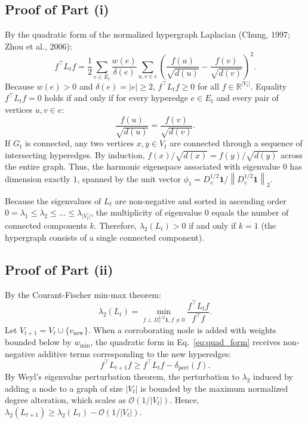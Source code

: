 \documentclass[11pt]{article}
\newcommand{\R}{\mathbb{R}}
\newcommand{\norm}[1]{\left\lVert#1\right\rVert}
\begin{document}
\subsection{Proof of Part (i)}
By the quadratic form of the normalized hypergraph Laplacian (Chung, 1997; Zhou et al., 2006):
\begin{equation}
  f^\top L_t f = \frac{1}{2} \sum_{e \in E_t} \frac{w(e)}{\delta(e)} \sum_{u, v \in e} \left( \frac{f(u)}{\sqrt{d(u)}} - \frac{f(v)}{\sqrt{d(v)}} \right)^2.
  \label{eq:quad_form}
\end{equation}
Because $w(e) > 0$ and $\delta(e) = |e| \ge 2$, $f^\top L_t f \ge 0$ for all $f \in \R^{|V_t|}$.
Equality $f^\top L_t f = 0$ holds if and only if for every hyperedge $e \in E_t$ and every pair of vertices $u, v \in e$:
\begin{equation}
  \frac{f(u)}{\sqrt{d(u)}} = \frac{f(v)}{\sqrt{d(v)}}.
\end{equation}
If $G_t$ is connected, any two vertices $x, y \in V_t$ are connected through a sequence of intersecting hyperedges. By induction, $f(x)/\sqrt{d(x)} = f(y)/\sqrt{d(y)}$ across the entire graph. Thus, the harmonic eigenspace associated with eigenvalue $0$ has dimension exactly $1$, spanned by the unit vector $\phi_1 = D_v^{1/2} \mathbf{1} / \norm{D_v^{1/2} \mathbf{1}}_2$.

Because the eigenvalues of $L_t$ are non-negative and sorted in ascending order $0 = \lambda_1 \le \lambda_2 \le \dots \le \lambda_{|V_t|}$, the multiplicity of eigenvalue $0$ equals the number of connected components $k$. Therefore, $\lambda_2(L_t) > 0$ if and only if $k = 1$ (the hypergraph consists of a single connected component).

\subsection{Proof of Part (ii)}
By the Courant-Fischer min-max theorem:
\begin{equation}
  \lambda_2(L_t) = \min_{f \perp D_v^{1/2}\mathbf{1}, f \ne 0} \frac{f^\top L_t f}{f^\top f}.
  \label{eq:courant_fischer_s}
\end{equation}
Let $V_{t+1} = V_t \cup \{v_{\text{new}}\}$. When a corroborating node is added with weights bounded below by $w_{\min}$, the quadratic form in Eq.~\eqref{eq:quad_form} receives non-negative additive terms corresponding to the new hyperedges:
\begin{equation}
  f^\top L_{t+1} f \ge f^\top L_t f - \delta_{\text{pert}}(f).
\end{equation}
By Weyl's eigenvalue perturbation theorem, the perturbation to $\lambda_2$ induced by adding a node to a graph of size $|V_t|$ is bounded by the maximum normalized degree alteration, which scales as $\mathcal{O}(1/|V_t|)$. Hence, $\lambda_2(L_{t+1}) \ge \lambda_2(L_t) - \mathcal{O}(1/|V_t|)$.
\end{document}
